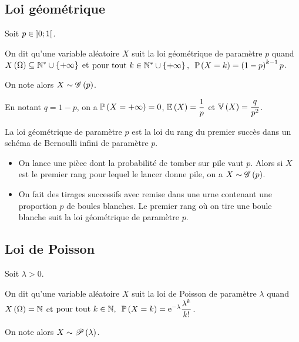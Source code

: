 \subsection{Loi géométrique}

\begin{defi}
Soit \(p\in\left]0;1\right[\).

On dit qu'une variable aléatoire \(X\) suit la loi géométrique de paramètre \(p\) quand \(X\left(\Omega\right)\subseteq\mathbb{N}^*\cup\left\lbrace+\infty\right\rbrace\) et \(\quantifs{\tpt k\in\Ns\union\accol{\pinf}}\proba{X=k}=\paren{1-p}^{k-1}p\).

On note alors \(X\sim\mathscr{G}\left(p\right)\).
\end{defi}

En notant \(q=1-p\), on a \(\mathbb{P}\left(X=+\infty\right)=0\), \(\operatorname{\mathbb{E}}\left(X\right)=\dfrac{1}{p}\) et \(\operatorname{\mathbb{V}}\left(X\right)=\dfrac{q}{p^2}\).

\begin{prop}
La loi géométrique de paramètre \(p\) est la loi du rang du premier succès dans un schéma de Bernoulli infini de paramètre \(p\).
\end{prop}

\begin{ex}
\begin{itemize}
    \item On lance une pièce dont la probabilité de tomber sur pile vaut \(p\). Alors si \(X\) est le premier rang pour lequel le lancer donne pile, on a \(X\sim\mathscr{G}\left(p\right)\). \\
    \item On fait des tirages successifs avec remise dans une urne contenant une proportion \(p\) de boules blanches. Le premier rang où on tire une boule blanche suit la loi géométrique de paramètre \(p\).
\end{itemize}
\end{ex}

\subsection{Loi de Poisson}

\begin{defi}
Soit \(\lambda>0\).

On dit qu'une variable aléatoire \(X\) suit la loi de Poisson de paramètre \(\lambda\) quand \(X\left(\Omega\right)=\mathbb{N}\) et \(\quantifs{\tpt k\in\N}\proba{X=k}=\e{-\lambda}\dfrac{\lambda^k}{k!}\).

On note alors \(X\sim\mathscr{P}\left(\lambda\right)\).
\end{defi}

